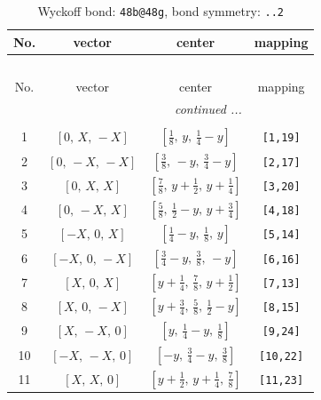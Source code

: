 \documentclass[fleqn,8pt]{jsarticle}
\begin{document}
\begin{longtable}{cccc}
\caption{Wyckoff bond: {\tt 48b@48g}, bond symmetry: {\tt ..2}}
 \\
 \hline \hline
No. & vector & center & mapping \\ \hline \endfirsthead

\multicolumn{3}{l}{\tablename\ \thetable{}} \\
 \hline \hline
No. & vector & center & mapping \\ \hline \endhead

 \hline \hline
\multicolumn{3}{r}{\footnotesize\it continued ...} \\ \endfoot

 \hline \hline
\multicolumn{3}{r}{} \\ \endlastfoot

1 & $\left[ 0,\, X,\, - X \right]$ & $\left[ \frac{1}{8},\, y,\, \frac{1}{4} - y \right]$ & {\tt [1,19]} \\ \hline
2 & $\left[ 0,\, - X,\, - X \right]$ & $\left[ \frac{3}{8},\, - y,\, \frac{3}{4} - y \right]$ & {\tt [2,17]} \\ \hline
3 & $\left[ 0,\, X,\, X \right]$ & $\left[ \frac{7}{8},\, y + \frac{1}{2},\, y + \frac{1}{4} \right]$ & {\tt [3,20]} \\ \hline
4 & $\left[ 0,\, - X,\, X \right]$ & $\left[ \frac{5}{8},\, \frac{1}{2} - y,\, y + \frac{3}{4} \right]$ & {\tt [4,18]} \\ \hline
5 & $\left[ - X,\, 0,\, X \right]$ & $\left[ \frac{1}{4} - y,\, \frac{1}{8},\, y \right]$ & {\tt [5,14]} \\ \hline
6 & $\left[ - X,\, 0,\, - X \right]$ & $\left[ \frac{3}{4} - y,\, \frac{3}{8},\, - y \right]$ & {\tt [6,16]} \\ \hline
7 & $\left[ X,\, 0,\, X \right]$ & $\left[ y + \frac{1}{4},\, \frac{7}{8},\, y + \frac{1}{2} \right]$ & {\tt [7,13]} \\ \hline
8 & $\left[ X,\, 0,\, - X \right]$ & $\left[ y + \frac{3}{4},\, \frac{5}{8},\, \frac{1}{2} - y \right]$ & {\tt [8,15]} \\ \hline
9 & $\left[ X,\, - X,\, 0 \right]$ & $\left[ y,\, \frac{1}{4} - y,\, \frac{1}{8} \right]$ & {\tt [9,24]} \\ \hline
10 & $\left[ - X,\, - X,\, 0 \right]$ & $\left[ - y,\, \frac{3}{4} - y,\, \frac{3}{8} \right]$ & {\tt [10,22]} \\ \hline
11 & $\left[ X,\, X,\, 0 \right]$ & $\left[ y + \frac{1}{2},\, y + \frac{1}{4},\, \frac{7}{8} \right]$ & {\tt [11,23]} \\ \hline

\end{longtable}
\end{document}
